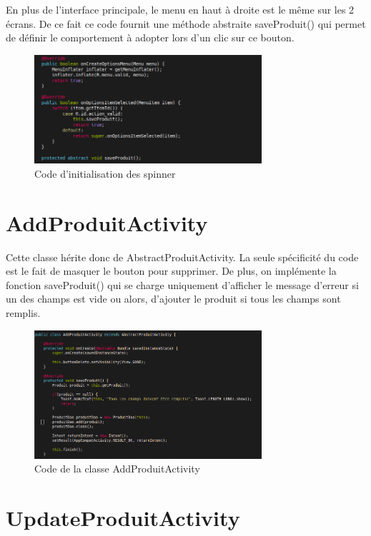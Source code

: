 \documentclass[report]{BetterDocument}
\begin{document}
			En plus de l'interface principale, le menu en haut à droite est le même sur les 2 écrans. De ce fait ce code fournit une méthode abstraite saveProduit() qui permet de définir le comportement à adopter lors d'un clic sur ce bouton.

			\begin{figure}[H]
				\centering\includegraphics[width=0.75\textwidth, keepaspectratio]{img/activity/AbstractProduitActivity/menu.png}
				\caption{Code d'initialisation des spinner}
			\end{figure}

		\section{AddProduitActivity}

			Cette classe hérite donc de AbstractProduitActivity. La seule spécificité du code est le fait de masquer le bouton pour supprimer. De plus, on implémente la fonction saveProduit() qui se charge uniquement d'afficher le message d'erreur si un des champs est vide ou alors, d'ajouter le produit si tous les champs sont remplis.

			\begin{figure}[H]
				\centering\includegraphics[width=0.75\textwidth, keepaspectratio]{img/activity/AddProduitActivity/code.png}
				\caption{Code de la classe AddProduitActivity}
			\end{figure}

		\section{UpdateProduitActivity}
\end{document}
